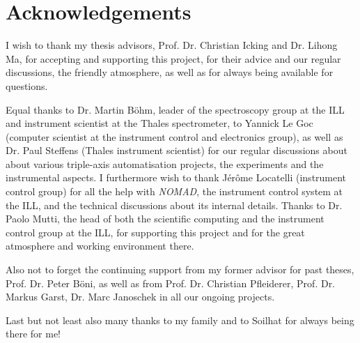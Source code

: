 %
%

\chapter*{Acknowledgements}

I wish to thank my thesis advisors, Prof. Dr. Christian Icking and Dr. Lihong Ma, for accepting 
and supporting this project, for their advice and our regular discussions, the friendly atmosphere, 
as well as for always being available for questions.

Equal thanks to Dr. Martin B\"ohm, leader of the spectroscopy group at the ILL and instrument 
scientist at the Thales spectrometer, to Yannick Le Goc (computer scientist at the instrument 
control and electronics group), as well as Dr. Paul Steffens (Thales instrument scientist) for our 
regular discussions about about various triple-axis automatisation projects, the experiments and the
instrumental aspects. I furthermore wish to thank Jérôme Locatelli (instrument control group) for
all the help with \textit{NOMAD}, the instrument control system at the ILL, and the technical discussions
about its internal details. 
Thanks to Dr. Paolo Mutti, the head of both the scientific computing and the instrument control group 
at the ILL, for supporting this project and for the great atmosphere and working environment there.

Also not to forget the continuing support from my former advisor for past theses, Prof. Dr. Peter B\"oni,
as well as from Prof. Dr. Christian Pfleiderer, Prof. Dr. Markus Garst, Dr. Marc Janoschek in all our ongoing projects.

Last but not least also many thanks to my family and to Soilhat for always being there for me!
